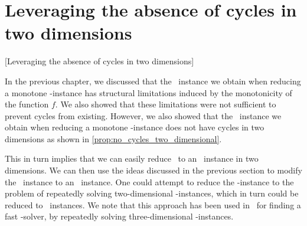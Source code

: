 \section{Leveraging the absence of cycles in two dimensions}[Leveraging the absence of cycles in two dimensions]

In the previous chapter, we discussed that the \EndOfLine\ instance we obtain when reducing a monotone \Tarskistar-instance has structural limitations induced by the monotonicity of the function $f$. We also showed that these limitations were not sufficient to prevent cycles from existing. However, we also showed that the \EndOfLine\ instance we obtain when reducing a monotone \Tarskistar-instance does not have cycles in two dimensions as shown in \cref{prop:no_cycles_two_dimensional}.

This in turn implies that we can easily reduce \Tarskistar\ to an \EndOfPotentialLine\ instance in two dimensions. We can then use the ideas discussed in the previous section to modify the \EndOfLine\ instance to an \EndOfPotentialLine\ instance. One could attempt to reduce the \Tarski-instance to the problem of repeatedly solving two-dimensional \Tarski-instances, which in turn could be reduced to \EndOfPotentialLine\ instances. We note that this approach has been used in~ for finding a fast \Tarski-solver, by repeatedly solving three-dimensional \Tarski-instances.